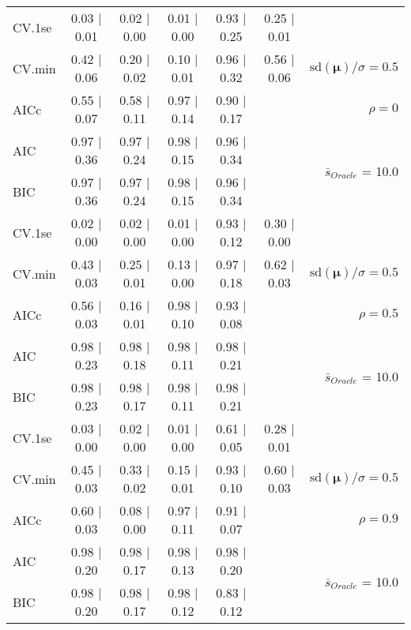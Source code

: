 \begin{table}
\begin{center}
\begin{tabular}{l*{5}{c}|r}
 \hline 
CV.1se & 0.03 $\mid$ 0.01 & 0.02 $\mid$ 0.00 & 0.01 $\mid$ 0.00 & 0.93 $\mid$ 0.25 & 0.25 $\mid$ 0.01 & \\
CV.min & 0.42 $\mid$ 0.06 & 0.20 $\mid$ 0.02 & 0.10 $\mid$ 0.01 & 0.96 $\mid$ 0.32 & 0.56 $\mid$ 0.06 &  $\mathrm{sd}(\mathbf{\mu})/\sigma=0.5$ \\
AICc & 0.55 $\mid$ 0.07 & 0.58 $\mid$ 0.11 & 0.97 $\mid$ 0.14 & 0.90 $\mid$ 0.17 & & $\rho=0$ \\
AIC & 0.97 $\mid$ 0.36 & 0.97 $\mid$ 0.24 & 0.98 $\mid$ 0.15 & 0.96 $\mid$ 0.34 & &  \multirow{2}{*}{$\bar{s}_{Oracle}$ = 10.0} \\
BIC & 0.97 $\mid$ 0.36 & 0.97 $\mid$ 0.24 & 0.98 $\mid$ 0.15 & 0.96 $\mid$ 0.34 & &  \\
 \hline 
CV.1se & 0.02 $\mid$ 0.00 & 0.02 $\mid$ 0.00 & 0.01 $\mid$ 0.00 & 0.93 $\mid$ 0.12 & 0.30 $\mid$ 0.00 & \\
CV.min & 0.43 $\mid$ 0.03 & 0.25 $\mid$ 0.01 & 0.13 $\mid$ 0.00 & 0.97 $\mid$ 0.18 & 0.62 $\mid$ 0.03 &  $\mathrm{sd}(\mathbf{\mu})/\sigma=0.5$ \\
AICc & 0.56 $\mid$ 0.03 & 0.16 $\mid$ 0.01 & 0.98 $\mid$ 0.10 & 0.93 $\mid$ 0.08 & & $\rho=0.5$ \\
AIC & 0.98 $\mid$ 0.23 & 0.98 $\mid$ 0.18 & 0.98 $\mid$ 0.11 & 0.98 $\mid$ 0.21 & &  \multirow{2}{*}{$\bar{s}_{Oracle}$ = 10.0} \\
BIC & 0.98 $\mid$ 0.23 & 0.98 $\mid$ 0.17 & 0.98 $\mid$ 0.11 & 0.98 $\mid$ 0.21 & &  \\
 \hline 
CV.1se & 0.03 $\mid$ 0.00 & 0.02 $\mid$ 0.00 & 0.01 $\mid$ 0.00 & 0.61 $\mid$ 0.05 & 0.28 $\mid$ 0.01 & \\
CV.min & 0.45 $\mid$ 0.03 & 0.33 $\mid$ 0.02 & 0.15 $\mid$ 0.01 & 0.93 $\mid$ 0.10 & 0.60 $\mid$ 0.03 &  $\mathrm{sd}(\mathbf{\mu})/\sigma=0.5$ \\
AICc & 0.60 $\mid$ 0.03 & 0.08 $\mid$ 0.00 & 0.97 $\mid$ 0.11 & 0.91 $\mid$ 0.07 & & $\rho=0.9$ \\
AIC & 0.98 $\mid$ 0.20 & 0.98 $\mid$ 0.17 & 0.98 $\mid$ 0.13 & 0.98 $\mid$ 0.20 & &  \multirow{2}{*}{$\bar{s}_{Oracle}$ = 10.0} \\
BIC & 0.98 $\mid$ 0.20 & 0.98 $\mid$ 0.17 & 0.98 $\mid$ 0.12 & 0.83 $\mid$ 0.12 & &  \\
 \hline 
\end{tabular}
\end{center}
\vspace{-1cm}
\end{table}




